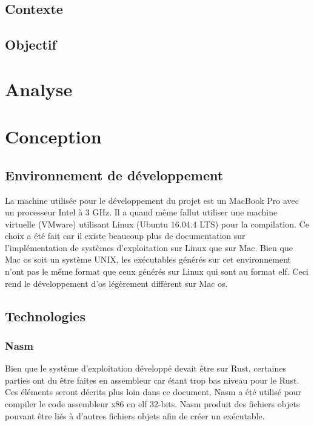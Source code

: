 \documentclass[a4paper, 12pt]{article}
\begin{document}
\subsection{Contexte}


\subsection{Objectif}

\newpage

\section{Analyse}

\newpage

\section{Conception}
\subsection{Environnement de développement}
La machine utilisée pour le développement du projet est un MacBook Pro avec un
processeur Intel à 3 GHz. Il a quand même fallut utiliser une machine virtuelle
(VMware) utilisant Linux (Ubuntu 16.04.4 LTS) pour la compilation. Ce choix a été
fait car il existe beaucoup plus de documentation sur l'implémentation de systèmes
d'exploitation sur Linux que sur Mac. Bien que Mac \acrshort{os} soit un système UNIX, les
exécutables générés sur cet environnement n'ont pas le même format que ceux générés
sur Linux qui sont au format \acrshort{elf}. Ceci rend le développement d'\acrshort{os} légèrement
différent sur Mac \acrshort{os}.


\subsection{Technologies}
\subsubsection{Nasm}
Bien que le système d'exploitation développé devait être sur Rust, certaines parties
ont du être faites en assembleur car étant trop bas niveau pour le Rust. Ces éléments
seront décrits plus loin dans ce document. Nasm a été  utilisé pour compiler le
code assembleur x86 en \acrshort{elf} 32-bits. Nasm produit des fichiers objets pouvant être
liés à d'autres fichiers objets afin de créer un exécutable. \\
\end{document}
